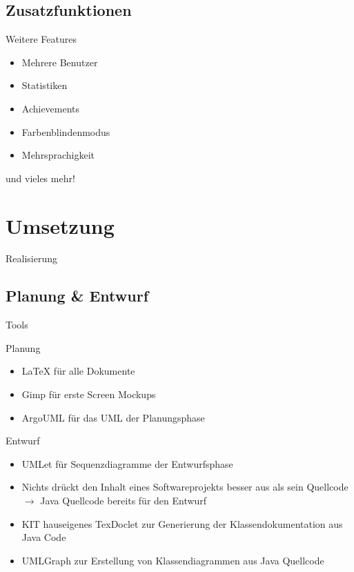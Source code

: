 \documentclass[18pt]{beamer}
\begin{document}
	\subsection{Zusatzfunktionen}
	\begin{frame}[<+->]{Weitere Features}
		\begin{itemize}
			\item Mehrere Benutzer
			\item Statistiken
			\item Achievements
			\item Farbenblindenmodus
			\item Mehrsprachigkeit
		\end{itemize}
		und vieles mehr!
	\end{frame}

\section{Umsetzung}
	\begin{frame}{Realisierung}
	\end{frame}

	\subsection{Planung \& Entwurf}
	\begin{frame}[<+->]{Tools}
		\begin{block}{Planung}
			\begin{itemize}
				\item LaTeX für alle Dokumente
				\item Gimp für erste Screen Mockups
				\item ArgoUML für das UML der Planungsphase
			\end{itemize}
		\end{block}
		\begin{block}{Entwurf}
			\begin{itemize}
				\item UMLet für Sequenzdiagramme der Entwurfsphase
				\item Nichts drückt den Inhalt eines Softwareprojekts besser aus als sein Quellcode \\
				$\rightarrow$ Java Quellcode bereits für den Entwurf
				\item KIT hauseigenes TexDoclet zur Generierung der Klassendokumentation aus Java Code
				\item UMLGraph zur Erstellung von Klassendiagrammen aus Java Quellcode
			\end{itemize}
		\end{block}
	\end{frame}
\end{document}
